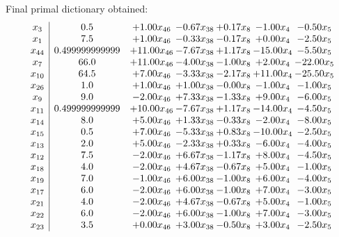 \documentclass[8pt]{article}
\begin{document}
 Final primal dictionary obtained: 
\[\begin{array}{c| c c@{\hskip 2pt} c@{\hskip 2pt} c@{\hskip 2pt} c@{\hskip 2pt} c@{\hskip 2pt} }
 x_{3}   &  0.5 & +  1.00 x_{46} & -0.67 x_{38} & +  0.17 x_{8} & -1.00 x_{4} & -0.50 x_{5}\\
 x_{1}   &  7.5 & +  1.00 x_{46} & -0.33 x_{38} & -0.17 x_{8} & +  0.00 x_{4} & -2.50 x_{5}\\
 x_{44}   &  0.499999999999 & + 11.00 x_{46} & -7.67 x_{38} & +  1.17 x_{8} & -15.00 x_{4} & -5.50 x_{5}\\
 x_{7}   &  66.0 & + 11.00 x_{46} & -4.00 x_{38} & -1.00 x_{8} & +  2.00 x_{4} & -22.00 x_{5}\\
 x_{10}   &  64.5 & +  7.00 x_{46} & -3.33 x_{38} & -2.17 x_{8} & + 11.00 x_{4} & -25.50 x_{5}\\
 x_{26}   &  1.0 & +  1.00 x_{46} & +  1.00 x_{38} & -0.00 x_{8} & -1.00 x_{4} & -1.00 x_{5}\\
 x_{9}   &  9.0 & -2.00 x_{46} & +  7.33 x_{38} & -1.33 x_{8} & +  9.00 x_{4} & -6.00 x_{5}\\
 x_{11}   &  0.499999999999 & + 10.00 x_{46} & -7.67 x_{38} & +  1.17 x_{8} & -14.00 x_{4} & -4.50 x_{5}\\
 x_{14}   &  8.0 & +  5.00 x_{46} & +  1.33 x_{38} & -0.33 x_{8} & -2.00 x_{4} & -8.00 x_{5}\\
 x_{15}   &  0.5 & +  7.00 x_{46} & -5.33 x_{38} & +  0.83 x_{8} & -10.00 x_{4} & -2.50 x_{5}\\
 x_{13}   &  2.0 & +  5.00 x_{46} & -2.33 x_{38} & +  0.33 x_{8} & -6.00 x_{4} & -4.00 x_{5}\\
 x_{12}   &  7.5 & -2.00 x_{46} & +  6.67 x_{38} & -1.17 x_{8} & +  8.00 x_{4} & -4.50 x_{5}\\
 x_{18}   &  4.0 & -2.00 x_{46} & +  4.67 x_{38} & -0.67 x_{8} & +  5.00 x_{4} & -1.00 x_{5}\\
 x_{19}   &  7.0 & -1.00 x_{46} & +  6.00 x_{38} & -1.00 x_{8} & +  6.00 x_{4} & -4.00 x_{5}\\
 x_{17}   &  6.0 & -2.00 x_{46} & +  6.00 x_{38} & -1.00 x_{8} & +  7.00 x_{4} & -3.00 x_{5}\\
 x_{21}   &  4.0 & -2.00 x_{46} & +  4.67 x_{38} & -0.67 x_{8} & +  5.00 x_{4} & -1.00 x_{5}\\
 x_{22}   &  6.0 & -2.00 x_{46} & +  6.00 x_{38} & -1.00 x_{8} & +  7.00 x_{4} & -3.00 x_{5}\\
 x_{23}   &  3.5 & +  0.00 x_{46} & +  3.00 x_{38} & -0.50 x_{8} & +  3.00 x_{4} & -2.50 x_{5}\\

\end{array}\]
\end{document}
